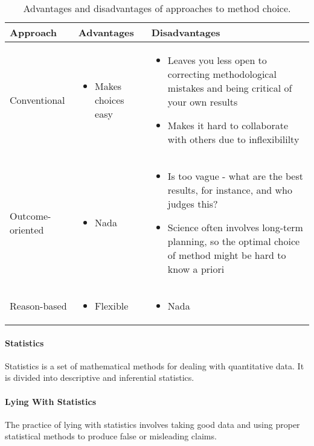 \begin{table}[!ht]
	\centering
	\begin{tabular}{| l | p{2in} | p{2in} |}
		\hline
		\textbf{Approach} & \textbf{Advantages} & \textbf{Disadvantages} \\
		\hline
		Conventional      & \begin{itemize}
			\item Makes choices easy
		\end{itemize} & \begin{itemize}
			\item Leaves you less open to correcting methodological mistakes and being critical of your own results
			\item Makes it hard to collaborate with others due to inflexibililty
	    \end{itemize} \\
    	\hline
    	Outcome-oriented & \begin{itemize}
    		\item Nada
    	\end{itemize} & \begin{itemize}
    		\item Is too vague - what are the best results, for instance, and who judges this?
    		\item Science often involves long-term planning, so the optimal choice of method might be hard to know a priori
	    \end{itemize} \\
    	\hline
    	Reason-based & \begin{itemize}
    		\item Flexible
    	\end{itemize} & \begin{itemize}
    		\item Nada
    	\end{itemize} \\
    	\hline
	\end{tabular}
	\caption{Advantages and disadvantages of approaches to method choice.}
\end{table}

\paragraph{Statistics}
Statistics is a set of mathematical methods for dealing with quantitative data. It is divided into descriptive and inferential statistics.

\paragraph{Lying With Statistics}
The practice of lying with statistics involves taking good data and using proper statistical methods to produce false or misleading claims.

